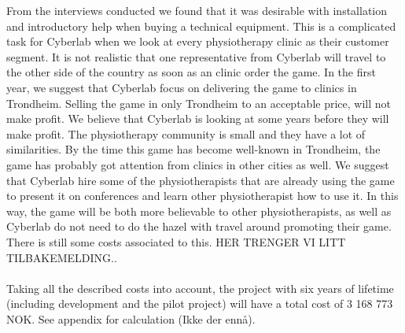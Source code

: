 From the interviews conducted we found that it was desirable with installation and introductory help when buying a technical equipment. This is a complicated task for Cyberlab when we look at every physiotherapy clinic as their customer segment. It is not realistic that one representative from Cyberlab will travel to the other side of the country as soon as an clinic order the game. In the first year, we suggest that Cyberlab focus on delivering the game to clinics in Trondheim. Selling the game in only Trondheim to an acceptable price, will not make profit. We believe that Cyberlab is looking at some years before they will make profit. The physiotherapy community is small and they have a lot of similarities. By the time this game has become well-known in Trondheim, the game has probably got attention from clinics in other cities as well. We suggest that Cyberlab hire some of the physiotherapists that are already using the game to present it on conferences and learn other physiotherapist how to use it. In this way, the game will be both more believable to other physiotherapists, as well as Cyberlab do not need to do the hazel with travel around promoting their game. There is still some costs associated to this. HER TRENGER VI LITT TILBAKEMELDING..\\ \\
Taking all the described costs into account, the project with six years of lifetime (including development and the pilot project) will have a total cost of 3 168 773 NOK. See appendix for calculation (Ikke der ennå). 